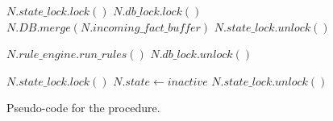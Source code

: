 \begin{figure}
\begin{algorithm}[H]
   $N.state\_lock.lock()$\;
   $N.db\_lock.lock()$\;
   $N.DB.merge(N.incoming\_fact\_buffer)$\;
   $N.state\_lock.unlock()$\;

   $N.rule\_engine.run\_rules()$\;
   $N.db\_lock.unlock()$\;


   $N.state\_lock.lock()$\;
   $N.state \longleftarrow inactive$\;
   $N.state\_lock.unlock()$\;
\end{algorithm}
\caption{Pseudo-code for the  procedure.}
 \label{alg:multicore:process_node}
\end{figure}
